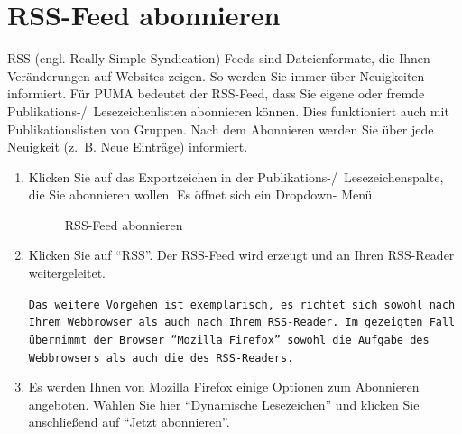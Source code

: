 \section{RSS-Feed abonnieren} 
\label{sec:rssFeedAbonnieren}
RSS (engl. Really Simple Syndication)-Feeds sind Dateienformate, die Ihnen Veränderungen auf Websites zeigen. So werden Sie immer über Neuigkeiten informiert. Für PUMA bedeutet der RSS-Feed, dass Sie eigene oder fremde Publikations-/~Lesezeichenlisten abonnieren können. Dies funktioniert auch mit Publikationslisten von Gruppen. Nach dem Abonnieren werden Sie über jede Neuigkeit (z.~B. Neue Einträge) informiert. 
\begin{enumerate}
    \item Klicken Sie auf das Exportzeichen in der Publikations-/~Lesezeichenspalte, die Sie abonnieren wollen. Es öffnet sich ein Dropdown- Menü.
\begin{figure}[h!]
 \centering
 \caption{RSS-Feed abonnieren}
 \label{fig:rssFeedAbbonnieren}
\end{figure}
    \item  Klicken Sie auf \enquote{RSS}. Der RSS-Feed wird erzeugt und an Ihren RSS-Reader weitergeleitet. 
\begin{mdframed}[style=mdfexample1,frametitle={\texttt{ACHTUNG}},backgroundcolor=gray!40]\texttt{Das weitere Vorgehen ist exemplarisch, es richtet sich sowohl nach Ihrem Webbrowser als auch nach Ihrem RSS-Reader. Im gezeigten Fall übernimmt der Browser \enquote{Mozilla Firefox} sowohl die Aufgabe des Webbrowsers als auch die des RSS-Readers.}
\end{mdframed}
    \item Es werden Ihnen von Mozilla Firefox einige Optionen zum Abonnieren angeboten. Wählen Sie hier \enquote{Dynamische Lesezeichen} und klicken Sie anschließend auf \enquote{Jetzt abonnieren}.
\begin{figure}[h!]
 \centering

\end{figure}
\end{enumerate}
